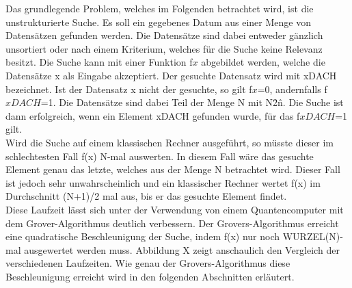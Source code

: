 Das grundlegende Problem, welches im Folgenden betrachtet wird, ist die unstrukturierte Suche. Es soll ein gegebenes Datum aus einer Menge von Datensätzen gefunden werden. Die Datensätze sind dabei entweder gänzlich unsortiert oder nach einem Kriterium, welches für die Suche keine Relevanz besitzt. Die Suche kann mit einer Funktion f\(x\) abgebildet werden, welche die Datensätze x als Eingabe akzeptiert. Der gesuchte Datensatz wird mit xDACH bezeichnet. Ist der Datensatz x nicht der gesuchte, so gilt f\(x\)=0, andernfalls f\( xDACH\)=1. Die Datensätze sind dabei Teil der Menge N mit N\=2\^n. Die Suche ist dann erfolgreich, wenn ein Element xDACH gefunden wurde, für das f\(xDACH\)=1 gilt.
\\
Wird die Suche auf einem klassischen Rechner ausgeführt, so müsste dieser im schlechtesten Fall f(x) N-mal auswerten. In diesem Fall wäre das gesuchte Element genau das letzte, welches aus der Menge N betrachtet wird. Dieser Fall ist jedoch sehr unwahrscheinlich und ein klassischer Rechner wertet f(x) im Durchschnitt (N+1)/2 mal aus, bis er das gesuchte Element findet.
\\
Diese Laufzeit lässt sich unter der Verwendung von einem Quantencomputer mit dem Grover-Algorithmus deutlich verbessern. Der Grovers-Algorithmus erreicht eine quadratische Beschleunigung der Suche, indem f(x) nur noch WURZEL(N)-mal ausgewertet werden muss. Abbildung X zeigt anschaulich den Vergleich der verschiedenen Laufzeiten. Wie genau der Grovers-Algorithmus diese Beschleunigung erreicht wird in den folgenden Abschnitten erläutert.
